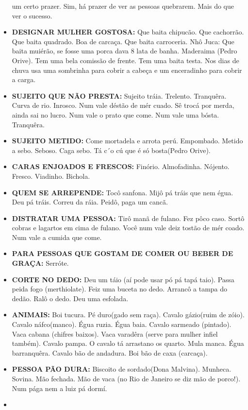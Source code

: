 \documentclass[12pt,brazil,]{book}
\begin{document}
\begin{itemize}
  um certo prazer. Sim, há prazer de ver as pessoas quebrarem. Mais do
  que ver o sucesso.
\item
  \textbf{DESIGNAR MULHER GOSTOSA:} Que baita chipucão. Que cachorrão.
  Que baita quadrado. Boa de carcaça. Que baita carroceria. Nhô Juca:
  Que baita muiérão, se fosse uma porca dava 8 lata de banha. Maderaima
  (Pedro Orive). Tem uma bela comissão de frente. Tem uma baita testa.
  Nos dias de chuva usa uma sombrinha para cobrir a cabeça e um
  enceradinho para cobrir a carga.\\
\item
  \textbf{SUJEITO QUE NÃO PRESTA:} Sujeito tráia. Trelento. Tranquêra.
  Curva de rio. Inrosco. Num vale déstão de mér cuado. Sê trocá por
  merda, ainda sai no lucro. Num vale o prato que come. Num vale uma
  bósta. Tranquêra.
\item
  \textbf{SUJEITO METIDO:} Come mortadela e arrota perú. Empombado.
  Metido a sebo. Seboso. Caga sebo. Tá c´o cú que é só bosta(Pedro
  Orive).
\item
  \textbf{CARAS ENJOADOS E FRESCOS:} Finório. Almofadinha. Nójento.
  Fresco. Viadinho. Bichola.
\item
  \textbf{QUEM SE ARREPENDE:} Tocô sanfona. Mijô pá tráis que nem égua.
  Deu pá tráis. Correu da ráia. Peidô, paga um cancã.
\item
  \textbf{DISTRATAR UMA PESSOA:} Tirô manã de fulano. Fez pôco caso.
  Sortô cobras e lagartos em cima de fulano. Você num vale deiz tostão
  de mér coado. Num vale a cumida que come.
\item
  \textbf{PARA PESSOAS QUE GOSTAM DE COMER OU BEBER DE GRAÇA:} Serróte.
\item
  \textbf{CORTE NO DEDO:} Deu um táio (aí pode usar pó pá tapá taio).
  Passa peida fogo (merthiolate). Feiz uma buceta no dedo. Arrancô a
  tampa do dedão. Ralô o dedo. Deu uma esfolada.
\item
  \textbf{ANIMAIS:} Boi tucura. Pé duro(gado sem raça). Cavalo
  gázio(ruim de zóio). Cavalo náfco(manco). Égua ruzia. Égua baia.
  Cavalo sarmeado (pintado). Vaca cabana (chifres baixos). Vaca varadêra
  (serve para mulher infiel também). Cavalo pampa. O cavalo tá arrastano
  os quarto. Mula manca. Égua barranquêra. Cavalo bão de andadura. Boi
  bão de caxa (carcaça).
\item
  \textbf{PESSOA PÃO DURA:} Biscoito de sordado(Dona Malvina). Munheca.
  Sovina. Mão fechada. Mão de vaca (no Rio de Janeiro se diz mão de
  porco!). Num pága nem a luiz pá dormí.
\item

\end{itemize}
\end{document}
